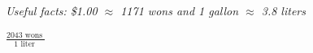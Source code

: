 \documentclass[12pt]{article}
\begin{document}
\begin{enumerate}
\emph{Useful facts:  \$1.00 $\approx$ 1171 wons and 1 gallon $\approx$ 3.8 liters }\vfill


\vspace{0.1in}

$ \displaystyle \frac{ 2043 \mbox{ wons } }{1 \mbox{ liter } }$
\vfill


\end{enumerate}



\end{document}
